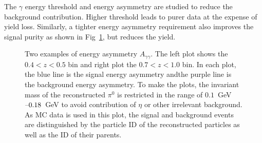 The $\gamma$ energy threshold and energy asymmetry are studied to reduce the background contribution. Higher threshold leads to purer data at the expense of yield loss. Similarly, a tighter energy asymmetry requirement also improves the signal purity as shown in Fig~\ref{fig:photon_asymmetry}, but reduces the yield.
\begin{figure}[H]
\centering
  \caption{Two examples of energy asymmetry $A_{\gamma\gamma}$. The left plot shows the $0.4<z<0.5$ bin and right plot the $0.7<z<1.0$ bin. In each plot, the blue line is the signal energy asymmetry andthe  purple line is the background energy asymmetry. To make the plots, the invariant mass of the reconstructed $\pi^0$ is restricted in the range of $0.1$~GeV$\textup{--}0.18$~GeV to avoid contribution of $\eta$ or other irrelevant background. As MC data is used in this plot, the signal and background events are distinguished by the particle ID of the reconstructed particles as well as the ID of their parents.}
\label{fig:photon_asymmetry}
\end{figure}

